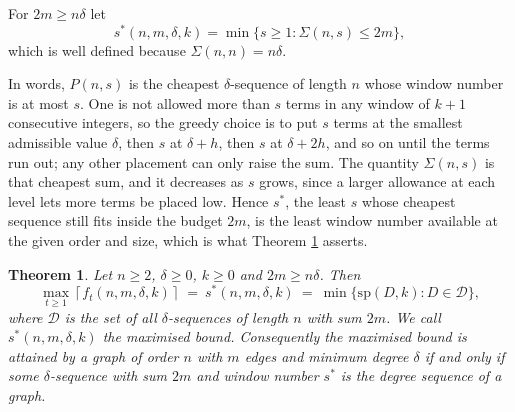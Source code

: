 \documentclass[12pt,a4paper]{article}%
\newtheorem{theorem}{Theorem}
\begin{document}
For $2m\geq n\delta $ let
\[
s^{\ast }(n,m,\delta ,k)=\min \{s\geq 1:\Sigma (n,s)\leq 2m\},
\]
which is well defined because $\Sigma (n,n)=n\delta $.

In words, $P(n,s)$ is the cheapest $\delta $-sequence of length $n$ whose window
number is at most $s$. One is not allowed more than $s$ terms in any window of
$k+1$ consecutive integers, so the greedy choice is to put $s$ terms at the
smallest admissible value $\delta $, then $s$ at $\delta +h$, then $s$ at
$\delta +2h$, and so on until the terms run out; any other placement can only
raise the sum. The quantity $\Sigma (n,s)$ is that cheapest sum, and it
decreases as $s$ grows, since a larger allowance at each level lets more terms
be placed low. Hence $s^{\ast }$, the least $s$ whose cheapest sequence still
fits inside the budget $2m$, is the least window number available at the given
order and size, which is what Theorem \ref{Tm_sequence} asserts.



\begin{theorem}
\label{Tm_sequence}Let $n\geq 2$, $\delta \geq 0$, $k\geq 0$ and $2m\geq n\delta $. Then
\[
\max_{t\geq 1}\left\lceil f_{t}(n,m,\delta ,k)\right\rceil \ =\ s^{\ast }(n,m,\delta ,k)\ =\ \min
\{\mathrm{sp}(D,k):D\in \mathcal{D}\},
\]
where $\mathcal{D}$ is the set of all $\delta $-sequences of length $n$ with sum $2m$. We call
$s^{\ast }(n,m,\delta ,k)$ the \emph{maximised bound}. Consequently the maximised bound is attained by a graph of order
$n$ with $m$ edges and minimum degree $\delta $ if and only if some $\delta $-sequence with sum
$2m$ and window number $s^{\ast }$ is the degree sequence of a graph.
\end{theorem}
\end{document}
